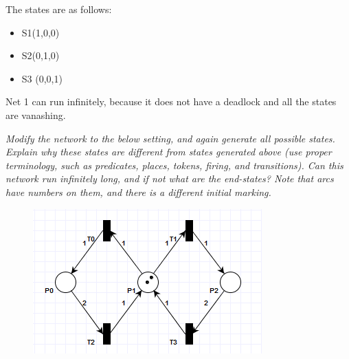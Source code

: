 \documentclass[letterpaper]{article}
\begin{document}
The states are as follows:

\begin{itemize}
 \item S1(1,0,0)
 \item S2(0,1,0)
 \item S3 (0,0,1)
\end{itemize}

Net 1 can run infinitely, because it does not have a deadlock and all the states
are vanashing.

\textit{Modify the network to the below setting, and again generate all possible states. Explain why these states are different from states generated above (use proper terminology, such as predicates, places, tokens, firing, and transitions). Can this network run infinitely long, and if not what are the end-states?
 Note that arcs have numbers on them, and there is a different initial marking.
}

\begin{figure}[H]
 \centering
 \includegraphics[width=\textwidth]{image2.png}
\end{figure}

\section{}
\end{document}
